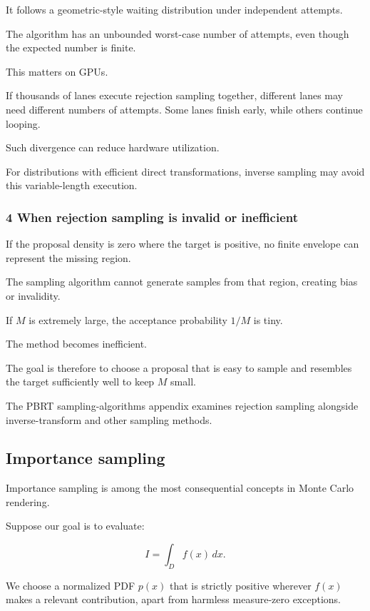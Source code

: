 It follows a geometric-style waiting distribution under independent attempts.

The algorithm has an unbounded worst-case number of attempts, even though the expected number is finite.

This matters on GPUs.

If thousands of lanes execute rejection sampling together, different lanes may need different numbers of attempts. Some lanes finish early, while others continue looping.

Such divergence can reduce hardware utilization.

For distributions with efficient direct transformations, inverse sampling may avoid this variable-length execution.

\subsubsection{4 When rejection sampling is invalid or inefficient}\label{02-foundations-ii-ch029-when-rejection-sampling-is-invalid-or-inefficient}

If the proposal density is zero where the target is positive, no finite envelope can represent the missing region.

The sampling algorithm cannot generate samples from that region, creating bias or invalidity.

If \(M\) is extremely large, the acceptance probability \(1/M\) is tiny.

The method becomes inefficient.

The goal is therefore to choose a proposal that is easy to sample and resembles the target sufficiently well to keep \(M\) small.

The PBRT sampling-algorithms appendix examines rejection sampling alongside inverse-transform and other sampling methods.

\subsection{Importance sampling}\label{02-foundations-ii-ch029-importance-sampling}

Importance sampling is among the most consequential concepts in Monte Carlo rendering.

Suppose our goal is to evaluate:

\[
 \boxed{ I=\int_Df(x)\,dx }.
\]

We choose a normalized PDF \(p(x)\) that is strictly positive wherever \(f(x)\) makes a relevant contribution, apart from harmless measure-zero exceptions.

